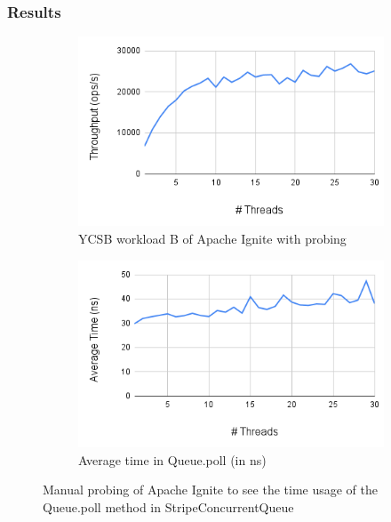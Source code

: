 \documentclass[conference]{IEEEtran}
\begin{document}
\subsubsection{Results}


\begin{figure}
     \centering
     \begin{subfigure}[b]{0.45\textwidth}
         \centering
         \includegraphics[width=\textwidth]{probe_throughput.png}
         \caption{YCSB workload B of Apache Ignite with probing}
         \label{benchmark_probe}
     \end{subfigure}
     \hfill
     \begin{subfigure}[b]{0.45\textwidth}
         \centering
         \includegraphics[width=\textwidth]{probe_results.png}
         \caption{Average time in Queue.poll (in ns)}
         \label{avg_poll}
     \end{subfigure}
\caption{Manual probing of Apache Ignite to see the time usage of the Queue.poll method in StripeConcurrentQueue}
\label{probe}
\end{figure}
\end{document}
